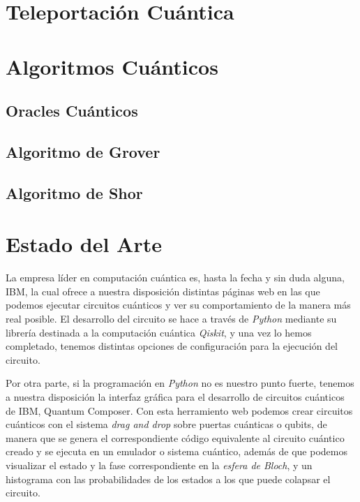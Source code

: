 \documentclass{article}
\numberwithin{equation}{section} %
\begin{document}
    \section{Teleportación Cuántica}
    \section{Algoritmos Cuánticos}
    \subsection{Oracles Cuánticos}
    \subsection{Algoritmo de Grover}
    \subsection{Algoritmo de Shor}

    \section{Estado del Arte}

    \vspace{5mm}

    La empresa líder en computación cuántica es, hasta la fecha y sin duda alguna, IBM, la cual ofrece a nuestra disposición distintas páginas web en las que podemos ejecutar circuitos cuánticos y ver su comportamiento de la manera más real posible. El desarrollo del circuito se hace a través de \textit{Python} mediante su librería destinada a la computación cuántica \textit{Qiskit}, y una vez lo hemos completado, tenemos distintas opciones de configuración para la ejecución del circuito.

    \vspace{5mm}

    Por otra parte, si la programación en \textit{Python} no es nuestro punto fuerte, tenemos a nuestra disposición la interfaz gráfica para el desarrollo de circuitos cuánticos de IBM, Quantum Composer. Con esta herramiento web podemos crear circuitos cuánticos con el sistema \textit{drag and drop} sobre puertas cuánticas o qubits, de manera que se genera el correspondiente código equivalente al circuito cuántico creado y se ejecuta en un emulador o sistema cuántico, además de que podemos visualizar el estado y la fase correspondiente en la \textit{esfera de Bloch}, y un histograma con las probabilidades de los estados a los que puede colapsar el circuito.
    
\end{document}
